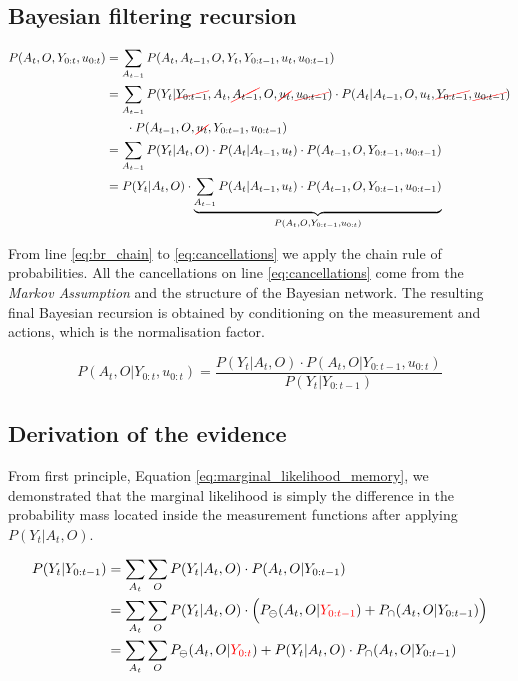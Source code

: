 \subsection{Bayesian filtering recursion}\label{appendix:bayes_recursion}

\begin{align}
  P(A_t,O,Y_{0:t},u_{0:t}) &= \sum_{A_{t-1}} P(A_t,A_{t-1},O,Y_t,Y_{0:t-1},u_{t},u_{0:t-1}) \label{eq:br_chain} \\
		           &= \sum_{A_{t-1}} P(Y_t|\Ccancel[red]{Y_{0:t-1}},A_t,\cancel{A_{t-1}},O,\cancel{u_{t}},\cancel{u_{0:t-1}}) \label{eq:cancellations}
		           \cdot  P(A_t|A_{t-1},O,u_{t},\cancel{Y_{0:t-1}},\cancel{u_{0:t-1}}) \\\nonumber 
		           & \;\;\;\;\;\;  \cdot  P( A_{t-1},O,\Ccancel[red]{u_t},Y_{0:t-1},u_{0:t-1}) \\
		           &= \sum_{A_{t-1}} P(Y_t|A_{t},O) \cdot P(A_t|A_{t-1},u_{t}) \cdot P(A_{t-1},O,Y_{0:t-1},u_{0:t-1}) \\
		           &= P(Y_t|A_{t},O) \cdot \underbrace{\sum_{A_{t-1}} P(A_t|A_{t-1},u_t) \cdot P(A_{t-1},O,Y_{0:t-1},u_{0:t-1})}_{P(A_t,O,Y_{0:t-1},u_{0:t})}
\end{align}

From line \ref{eq:br_chain} to \ref{eq:cancellations} we apply the chain rule of probabilities.
All the cancellations on line \ref{eq:cancellations} come from the \textit{Markov Assumption} and the structure of the Bayesian network.
The resulting final Bayesian recursion is obtained by conditioning on the measurement and actions, which is the normalisation factor.

\begin{equation}
 P(A_t,O|Y_{0:t},u_{0:t}) = \frac{P(Y_t|A_{t},O) \cdot P(A_{t},O|Y_{0:t-1},u_{0:t})}{P(Y_t|Y_{0:t-1})}
\end{equation}


\subsection{Derivation of the evidence}\label{appendix:evidence}

From first principle, Equation \ref{eq:marginal_likelihood_memory}, we demonstrated that the marginal likelihood is simply the difference
in the probability mass located inside the measurement functions after applying $P(Y_t|A_t,O)$.

\begin{align} \label{eq:marginal_likelihood_memory}
 P(Y_t|Y_{0:t-1}) &= \sum\limits_{A_t}\sum\limits_{O} P(Y_t|A_t,O)\cdot P(A_t,O|Y_{0:t-1}) \\
		  &= \sum\limits_{A_t}\sum\limits_{O} P(Y_t|A_t,O)\cdot \Big(P_{\ominus}(A_t,O|{\color{red}Y_{0:t-1}}) + P_{\cap}(A_t,O|Y_{0:t-1})\Big)\\
		  &= \sum\limits_{A_t}\sum\limits_{O} P_{\ominus}(A_t,O|{\color{red}Y_{0:t}}) + P(Y_t|A_t,O)\cdot P_{\cap}(A_t,O|Y_{0:t-1}) \label{eq:marginal_likelihood_memory_last}
\end{align}


